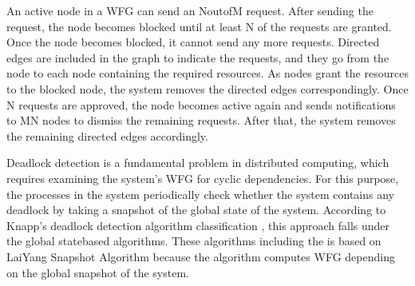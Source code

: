 \documentclass[letterpaper,10pt,english]{sphinxmanual}
\begin{document}
\sphinxAtStartPar
An active node in a WFG can send an N\sphinxhyphen{}out\sphinxhyphen{}of\sphinxhyphen{}M request. After sending the request, the node becomes blocked until at least N of the requests are granted. Once the node becomes blocked, it cannot send any more requests. Directed edges are included in the graph to indicate the requests, and they go from the node to each node containing the required resources. As nodes grant the resources to the blocked node, the system removes the directed edges correspondingly. Once N requests are approved, the node becomes active again and sends notifications to M\sphinxhyphen{}N nodes to dismiss the remaining requests. After that, the system removes the remaining directed edges accordingly.  

\sphinxAtStartPar
Deadlock detection is a fundamental problem in distributed computing, which requires examining the system’s WFG for cyclic dependencies. For this purpose, the processes in the system periodically check whether the system contains any deadlock by taking a snapshot of the global state of the system.  According to Knapp’s deadlock detection algorithm classification , this approach falls under the global state\sphinxhyphen{}based algorithms. These algorithms including the {\hyperref[\detokenize{docs/BrachaToueg/algorithm:brachatouegdeadlockdetectionalgorithm}]{}} is based on Lai\sphinxhyphen{}Yang Snapshot Algorithm  because the algorithm computes WFG depending on the global snapshot of the system.
\end{document}
